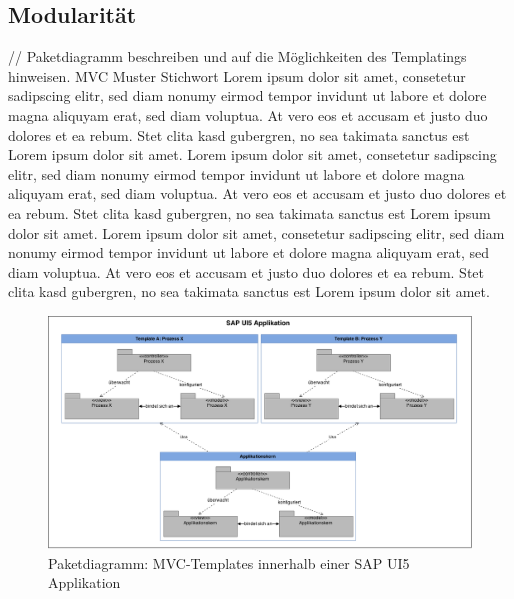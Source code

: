 \newpage
\subsection{Modularität}
// Paketdiagramm beschreiben und auf die Möglichkeiten des Templatings hinweisen. MVC Muster Stichwort
Lorem ipsum dolor sit amet, consetetur sadipscing elitr, sed diam nonumy eirmod tempor invidunt ut labore et dolore magna aliquyam erat, sed diam voluptua. At vero eos et accusam et justo duo dolores et ea rebum. Stet clita kasd gubergren, no sea takimata sanctus est Lorem ipsum dolor sit amet. Lorem ipsum dolor sit amet, consetetur sadipscing elitr, sed diam nonumy eirmod tempor invidunt ut labore et dolore magna aliquyam erat, sed diam voluptua. At vero eos et accusam et justo duo dolores et ea rebum. Stet clita kasd gubergren, no sea takimata sanctus est Lorem ipsum dolor sit amet. Lorem ipsum dolor sit amet, consetetur sadipscing elitr, sed diam nonumy eirmod tempor invidunt ut labore et dolore magna aliquyam erat, sed diam voluptua. At vero eos et accusam et justo duo dolores et ea rebum. Stet clita kasd gubergren, no sea takimata sanctus est Lorem ipsum dolor sit amet. 

\vspace{1em}
\begin{figure}[htb]
  \centering
  \includegraphics[width=1\linewidth]{abb/sapui5_mvc_templates}
  \caption[Paketdiagramm: MVC-Templates innerhalb einer SAP UI5 Applikation]{Paketdiagramm: MVC-Templates innerhalb einer SAP UI5 Applikation}
  \label{fig:paketdiagramm}
\end{figure}

\newpage
